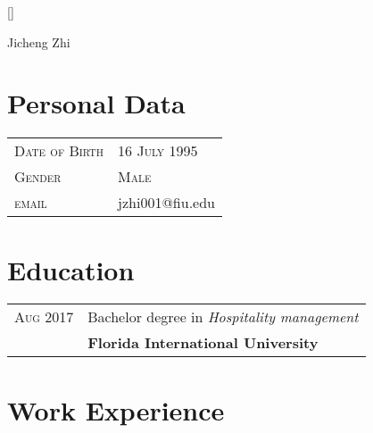 \documentclass[11pt,a4paper]{article}
\begin{document}
 

\pagestyle{empty}
\setlength{\textwidth}{500pt}

\titleformat{\section}{\large\scshape\raggedright}{}{0em}{}[\titlerule]
\titlespacing{\section}{0pt}{3pt}{3pt}

\par{\centering
		{\Huge Jicheng \Huge{Zhi}
	}\bigskip
	\par}
	
\section{Personal Data}

\noindent\begin{tabular}{p{7cm} l}
	\textsc{Date of Birth} & \textsc{16 July 1995} \\
	\textsc{Gender} & \textsc{Male}\\
    \textsc{email} & jzhi001@fiu.edu
    
\end{tabular}

\section{Education}

\noindent\begin{tabular}{p{5cm} l}
	\textsc{Aug 2017} 
		& Bachelor degree in \emph{Hospitality management}\\
		&\textbf{Florida International University}\\
\end{tabular}

\section{Work Experience}
\end{document}
